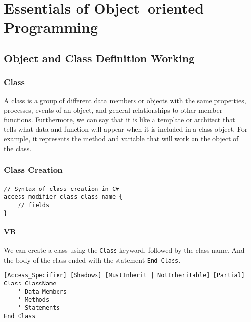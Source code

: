\chapter{Essentials of Object–oriented Programming}

\section{Object and Class Definition Working}

\subsection{Class}
A class is a group of different data members or objects with the same properties, processes, events of an object, and general relationships to other member functions. Furthermore, we can say that it is like a template or architect that tells what data and function will appear when it is included in a class object. For example, it represents the method and variable that will work on the object of the class.

\subsection*{Class Creation}
\subsubsection*{{\cs}}
\begin{lstlisting}
// Syntax of class creation in C#	
access_modifier class class_name {
	// fields
}
\end{lstlisting}

\subsubsection*{VB}
We can create a class using the \texttt{Class} keyword, followed by the class name. And the body of the class ended with the statement \texttt{End Class}. 

\begin{lstlisting}[style=vb]
[Access_Specifier] [Shadows] [MustInherit | NotInheritable] [Partial] Class ClassName
	' Data Members
	' Methods
	' Statements
End Class
\end{lstlisting}


